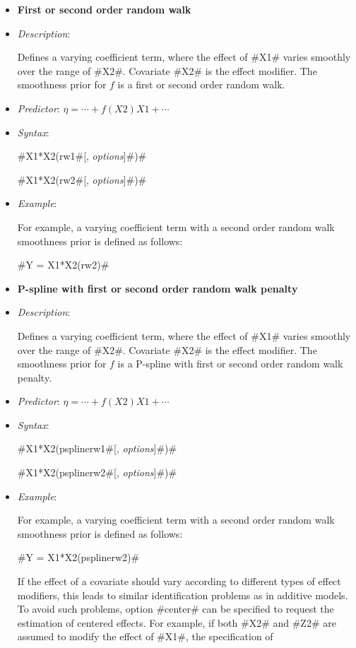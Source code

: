 \begin{itemize}
\item[]{\bf\sffamily First or second order random walk}

\item[] {\em Description}:

Defines a varying coefficient term, where the effect of #X1# varies
smoothly over the range of #X2#. Covariate #X2# is the effect
modifier. The smoothness prior for $f$ is a first or second order
random walk.
\item[] {\em Predictor}: $\eta= \cdots + f(X2)X1 + \cdots$
\item[] {\em Syntax}:

#X1*X2(rw1#[, {\em options}]#)#

#X1*X2(rw2#[, {\em options}]#)#
\item[] {\em Example}:

For example, a varying coefficient term with a second order random
walk smoothness prior is defined as follows:

#Y = X1*X2(rw2)#

\item[]{\bf\sffamily P-spline with first or second order random
walk penalty}

\item[] {\em Description}:

Defines a varying coefficient term, where the effect of #X1# varies
smoothly over the range of #X2#. Covariate #X2# is the effect
modifier. The smoothness prior for $f$ is a P-spline with first or
second order random walk penalty.
\item[] {\em Predictor}: $\eta= \cdots + f(X2)X1 + \cdots$
\item[] {\em Syntax}:

#X1*X2(psplinerw1#[, {\em options}]#)#

#X1*X2(psplinerw2#[, {\em options}]#)#
\item[] {\em Example}:

For example, a varying coefficient term with a second order random
walk smoothness prior is defined as follows:

#Y = X1*X2(psplinerw2)#

If the effect of a covariate should vary according to different
types of effect modifiers, this leads to similar identification
problems as in additive models. To avoid such problems, option
#center# can be specified to request the estimation of centered
effects. For example, if both #X2# and #Z2# are assumed to modify
the effect of #X1#, the specification of


\end{itemize}
